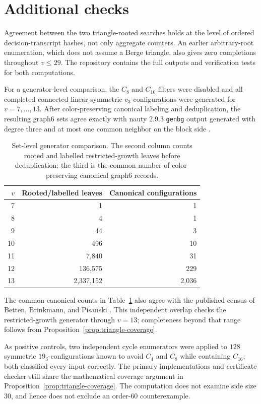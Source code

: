 \documentclass[11pt]{article}
\theoremstyle{definition}
\newcommand{\code}[1]{\texttt{#1}}
\begin{document}
\section{Additional checks}\label{sec:crosschecks}

Agreement between the two triangle-rooted searches holds at the level of
ordered decision-transcript hashes, not only aggregate counters. An earlier
arbitrary-root enumeration, which does not assume a Berge triangle, also
gives zero completions throughout \(v\leq29\). The repository contains the
full outputs and verification tests for both computations.

For a generator-level comparison, the \(C_8\) and \(C_{16}\) filters were
disabled and all completed connected linear symmetric
\(v_3\)-configurations were generated for \(v=7,\ldots,13\). After
color-preserving canonical labeling and deduplication, the resulting graph6
sets agree exactly with nauty 2.9.3 \code{genbg} output generated with degree
three and at most one common neighbor on the block side
\cite{McKayPiperno2014}.

\begin{table}[ht]
\centering
\small
\caption{Set-level generator comparison. The second column counts rooted
and labelled restricted-growth leaves before deduplication; the third is the
common number of color-preserving canonical graph6 records.}
\label{tab:genbg}
\begin{tabular}{rrr}
\toprule
\(v\) & Rooted/labelled leaves & Canonical configurations\\
\midrule
7  & 1         & 1\\
8  & 4         & 1\\
9  & 44        & 3\\
10 & 496       & 10\\
11 & 7,840     & 31\\
12 & 136,575   & 229\\
13 & 2,337,152 & 2,036\\
\bottomrule
\end{tabular}
\end{table}

The common canonical counts in Table~\ref{tab:genbg} also agree with the
published census of Betten, Brinkmann, and Pisanski
\cite{BettenBrinkmannPisanski2000}. This independent overlap checks the
restricted-growth generator through \(v=13\); completeness beyond that range
follows from Proposition~\ref{prop:triangle-coverage}.

As positive controls, two independent cycle enumerators were applied to
\(128\) symmetric \(19_3\)-configurations known to avoid \(C_4\) and \(C_8\)
while containing \(C_{16}\); both classified every input correctly. The
primary implementations and certificate checker still share the mathematical
coverage argument in Proposition~\ref{prop:triangle-coverage}. The computation
does not examine side size \(30\), and hence does not exclude an order-\(60\)
counterexample.
\end{document}
